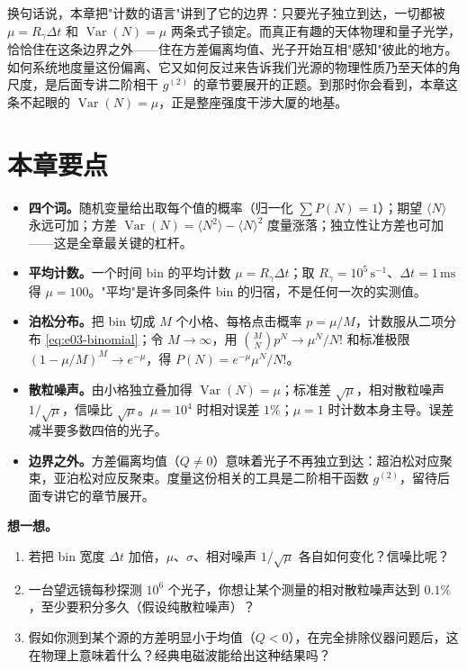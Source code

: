换句话说，本章把"计数的语言"讲到了它的边界：只要光子独立到达，一切都被 $\mu=R_\gamma\Delta t$ 和 $\operatorname{Var}(N)=\mu$ 两条式子锁定。而真正有趣的天体物理和量子光学，恰恰住在这条边界之外——住在方差偏离均值、光子开始互相"感知"彼此的地方。如何系统地度量这份偏离、它又如何反过来告诉我们光源的物理性质乃至天体的角尺度，是后面专讲二阶相干 $g^{(2)}$ 的章节要展开的正题。到那时你会看到，本章这条不起眼的 $\operatorname{Var}(N)=\mu$，正是整座强度干涉大厦的地基。

\section{本章要点}
\label{sec:e03-summary}

\begin{itemize}
  \item \textbf{四个词。}随机变量给出取每个值的概率（归一化 $\sum P(N)=1$）；期望 $\langle N\rangle$ 永远可加；方差 $\operatorname{Var}(N)=\langle N^2\rangle-\langle N\rangle^2$ 度量涨落；独立性让方差也可加——这是全章最关键的杠杆。
  \item \textbf{平均计数。}一个时间 bin 的平均计数 $\mu=R_\gamma\Delta t$；取 $R_\gamma=10^5\,\mathrm{s^{-1}}$、$\Delta t=1\,\mathrm{ms}$ 得 $\mu=100$。"平均"是许多同条件 bin 的归宿，不是任何一次的实测值。
  \item \textbf{泊松分布。}把 bin 切成 $M$ 个小格、每格点击概率 $p=\mu/M$，计数服从二项分布 \eqref{eq:e03-binomial}；令 $M\to\infty$，用 $\binom{M}{N}p^N\to\mu^N/N!$ 和标准极限 $(1-\mu/M)^M\to e^{-\mu}$，得 $P(N)=e^{-\mu}\mu^N/N!$。
  \item \textbf{散粒噪声。}由小格独立叠加得 $\operatorname{Var}(N)=\mu$；标准差 $\sqrt{\mu}$，相对散粒噪声 $1/\sqrt{\mu}$，信噪比 $\sqrt{\mu}$。$\mu=10^4$ 时相对误差 $1\%$；$\mu=1$ 时计数本身主导。误差减半要多数四倍的光子。
  \item \textbf{边界之外。}方差偏离均值（$Q\neq0$）意味着光子不再独立到达：超泊松对应聚束，亚泊松对应反聚束。度量这份相关的工具是二阶相干函数 $g^{(2)}$，留待后面专讲它的章节展开。
\end{itemize}

\medskip
\noindent\textbf{想一想。}
\begin{enumerate}
  \item 若把 bin 宽度 $\Delta t$ 加倍，$\mu$、$\sigma$、相对噪声 $1/\sqrt{\mu}$ 各自如何变化？信噪比呢？
  \item 一台望远镜每秒探测 $10^6$ 个光子，你想让某个测量的相对散粒噪声达到 $0.1\%$，至少要积分多久（假设纯散粒噪声）？
  \item 假如你测到某个源的方差明显小于均值（$Q<0$），在完全排除仪器问题后，这在物理上意味着什么？经典电磁波能给出这种结果吗？
\end{enumerate}
